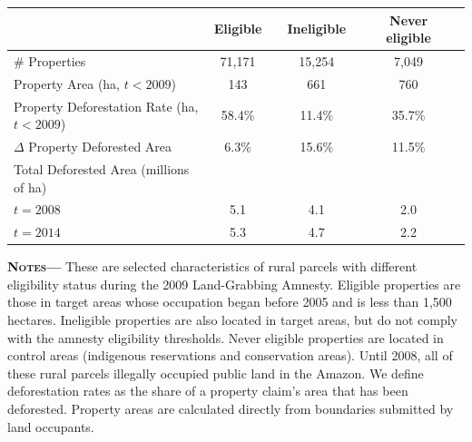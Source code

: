 \documentclass[12pt]{article}
\begin{document}
 \begin{center}
 \begin{threeparttable}[b]
 \singlespacing
 \footnotesize
    	\caption{\textsc{Characteristics of Occupations in Target and Control Areas}}
\setlength{\tabcolsep}{12pt}
\begin{tabular}{l*{6}c}  \midrule \midrule
& \multicolumn{1}{c}{\textbf{Eligible}}   &  & \multicolumn{1}{c}{\textbf{Ineligible}} &  & \multicolumn{1}{c}{\textbf{Never eligible}}  \\  %
   \midrule
\# Properties & 71,171 && 15,254 && 7,049 \\ 
Property Area {\scriptsize (ha, $t<2009$)} & 143 && 661 && 760 \\ 
Property Deforestation Rate {\scriptsize (ha, $t<2009$)} & 58.4\% && 11.4\% && 35.7\% \\
$\Delta$ Property Deforested Area & 6.3\% && 15.6\% && 11.5\% \\ 
Total Deforested Area {\scriptsize (millions of ha)} \\
\quad $t=2008$ & 5.1 && 4.1 && 2.0 \\ 
\quad $t=2014$ &  5.3 && 4.7 & &2.2 \\ 
   \midrule \midrule
	\end{tabular}
			\begin{tablenotes}[flushleft]
   \item {\justify\singlespacing\footnotesize {\textsc{\textbf{Notes---}}} These are selected characteristics of rural parcels with different eligibility status during the 2009 Land-Grabbing Amnesty. Eligible properties are those in target areas whose occupation began before 2005 and is less than 1,500 hectares. Ineligible properties are also located in target areas, but do not comply with the amnesty eligibility thresholds. Never eligible properties are located in control areas (indigenous reservations and conservation areas). Until 2008, all of these rural parcels illegally occupied public land in the Amazon. We define deforestation rates as the share of a property claim's area that has been deforested. Property areas are calculated directly from boundaries submitted by land occupants. }
    \end{tablenotes}
     \label{tab:1}
\end{threeparttable}
\end{center}
\end{document}
